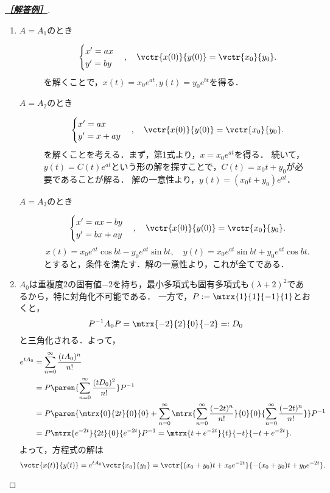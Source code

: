 \documentclass[uplatex,dvipdfmx]{jsarticle}
\begin{document}
\begin{proof}[\textbf{\underline{［解答例］}}]\mbox{}
    \begin{enumerate}
        \item \begin{description}
            \item[$A=A_1$のとき] \[\begin{cases}
                x'=ax\\
                y'=by
            \end{cases},\quad\vctr{x(0)}{y(0)}=\vctr{x_0}{y_0}.\]
            を解くことで，$x(t)=x_0e^{at},y(t)=y_0e^{bt}$を得る．
            \item[$A=A_2$のとき] \[\begin{cases}
                x'=ax\\
                y'=x+ay
            \end{cases},\quad\vctr{x(0)}{y(0)}=\vctr{x_0}{y_0}.\]
            を解くことを考える．まず，第1式より，$x=x_0e^{at}$を得る．
            続いて，$y(t)=C(t)e^{at}$という形の解を探すことで，$C(t)=x_0t+y_0$が必要であることが解る．
            解の一意性より，$y(t)=(x_0t+y_0)e^{at}$．
            \item[$A=A_3$のとき] \[\begin{cases}
                x'=ax-by\\
                y'=bx+ay
            \end{cases},\quad\vctr{x(0)}{y(0)}=\vctr{x_0}{y_0}.\]
            \[x(t)=x_0e^{at}\cos bt-y_0e^{at}\sin bt,\quad y(t)=x_0e^{at}\sin bt+y_0e^{at}\cos bt.\]
            とすると，条件を満たす．解の一意性より，これが全てである．
        \end{description}
        \item $A_0$は重複度$2$の固有値$-2$を持ち，最小多項式も固有多項式も$(\lambda+2)^2$であるから，特に対角化不可能である．
        一方で，$P:=\mtrx{1}{1}{-1}{1}$とおくと，
        \[P^{-1}A_0P=\mtrx{-2}{2}{0}{-2}=:D_0\]
        と三角化される．よって，
        \begin{align*}
            e^{tA_0}&=\sum_{n=0}^\infty\frac{(tA_0)^n}{n!}\\
            &=P\paren{\sum_{n=0}^\infty\frac{(tD_0)^2}{n!}}P^{-1}\\
            &=P\paren{\mtrx{0}{2t}{0}{0}+\sum_{n=0}^\infty\mtrx{\sum_{n=0}^\infty\frac{(-2t)^n}{n!}}{0}{0}{\sum_{n=0}^\infty\frac{(-2t)^n}{n!}}}P^{-1}\\
            &=P\mtrx{e^{-2t}}{2t}{0}{e^{-2t}}P^{-1}=\mtrx{t+e^{-2t}}{t}{-t}{-t+e^{-2t}}.
        \end{align*}
        よって，方程式の解は
        \[\vctr{x(t)}{y(t)}=e^{tA_0}\vctr{x_0}{y_0}=\vctr{(x_0+y_0)t+x_0e^{-2t}}{-(x_0+y_0)t+y_0e^{-2t}}.\]
    \end{enumerate}
\end{proof}
\end{document}
